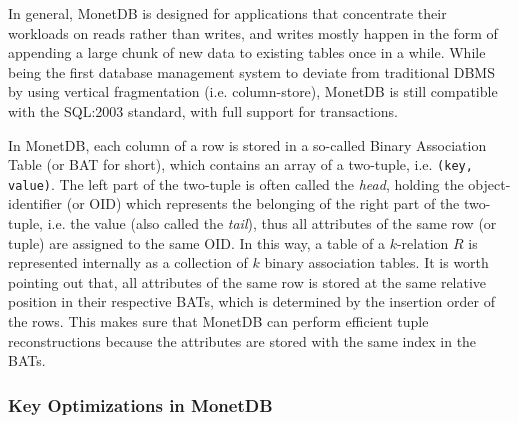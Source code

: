 \documentclass{article}
\begin{document}
In general, MonetDB is designed for applications that concentrate their workloads on reads rather than writes, and writes mostly happen in the form of appending a large chunk of new data to existing tables once in a while.\cite{idreos2012monetdb} While being the first database management system to deviate from traditional DBMS by using vertical fragmentation (i.e. column-store), MonetDB is still compatible with the SQL:2003 standard, with full support for transactions.

In MonetDB, each column of a row is stored in a so-called Binary Association Table (or BAT for short), which contains an array of a two-tuple, i.e. \texttt{(key, value)}. The left part of the two-tuple is often called the \textit{head}, holding the object-identifier (or OID) which represents the belonging of the right part of the two-tuple, i.e. the value (also called the \textit{tail}), thus all attributes of the same row (or tuple) are assigned to the same OID. In this way, a table of a $k$-relation $R$ is represented internally as a collection of $k$ binary association tables. It is worth pointing out that, all attributes of the same row is stored at the same relative position in their respective BATs, which is determined by the insertion order of the rows. This makes sure that MonetDB can perform efficient tuple reconstructions because the attributes are stored with the same index in the BATs.\cite{idreos2012monetdb}

\subsubsection{Key Optimizations in MonetDB}
\end{document}
